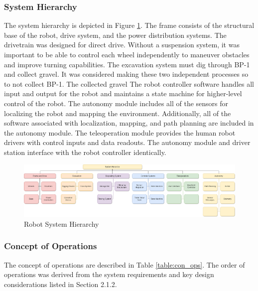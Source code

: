 \documentclass[class=article, crop=false]{standalone}
\begin{document}
	\subsubsection{System Hierarchy}
	The system hierarchy is depicted in Figure \ref{fig:system_hierarchy}. The frame consists of the structural base of the robot, drive system, and the power distribution systems. The drivetrain was designed for direct drive. Without a suspension system, it was important to be able to control each wheel independently to maneuver obstacles and improve turning capabilities. The excavation system must dig through BP-1 and collect gravel. It was considered making these two independent processes so to not collect BP-1.  The collected gravel The robot controller software handles all input and output for the robot and maintains a state machine for higher-level control of the robot. The autonomy module includes all of the sensors for localizing the robot and mapping the environment. Additionally, all of the software associated with localization, mapping, and path planning are included in the autonomy module. The teleoperation module provides the human robot drivers with control inputs and data readouts. The autonomy module and driver station interface with the robot controller identically.
	
	\FloatBarrier
		\begin{figure}[h]
			\centering
			\includegraphics[width=1.0\linewidth]{09_Figures/system_hierarchy.png}
			\caption{Robot System Hierarchy}
			\label{fig:system_hierarchy}
		\end{figure}
		\FloatBarrier
		
	\subsubsection{Concept of Operations}
	The concept of operations are described in Table \ref{table:con_ops}. The order of operations was derived from the system requirements and key design considerations listed in Section 2.1.2.
	
\end{document}
